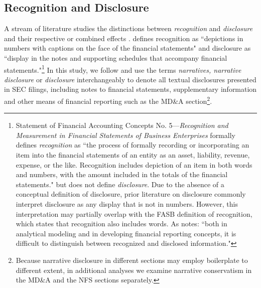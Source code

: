 \documentclass[letterpaper,11pt]{article}
\begin{document}
\begin{spacing}{1.5}
\subsection{Recognition and Disclosure}
A stream of literature studies the distinctions between \textit{recognition} and \textit{disclosure} and their respective or combined effects \cite{aboodyRecognitionDisclosureOil1996, barthMarketEffectsRecognition2003, schipperRequiredDisclosuresFinancial2007}.  defines recognition as ``depictions in numbers with captions on the face of the financial statements" and disclosure as ``display in the notes and supporting schedules that accompany financial statements."\footnote{Statement of Financial Accounting Concepts No. 5---\textit{Recognition and Measurement in Financial Statements of Business Enterprises} formally defines \textit{recognition} as ``the process of formally recording or incorporating an item into the financial statements of an entity as an asset, liability, revenue, expense, or the like. Recognition includes depiction of an item in both words and numbers, with the amount included in the totals of the financial statements."  but does not define \textit{disclosure}. Due to the absence of a conceptual definition of disclosure, prior literature on disclosure commonly interpret disclosure as any display that is not in numbers. However, this interpretation may partially overlap with the FASB definition of recognition, which states that recognition also includes words. As  notes: ``both in analytical modeling and in developing financial reporting concepts, it is difficult to distinguish between recognized and disclosed information."} In this study, we follow  and use the terms \textit{narratives, narrative disclosure} or \textit{disclosure} interchangeably to denote all textual disclosures presented in SEC filings, including notes to financial statements, supplementary information and other means of financial reporting such as the MD\&A section\footnote{Because narrative disclosure in different sections may employ boilerplate to different extent, in additional analyses we examine narrative conservatism in the MD\&A and the NFS sections separately.}. 


\end{spacing}
\end{document}
